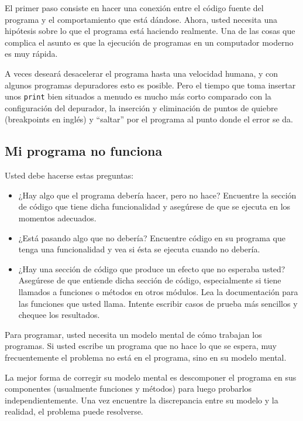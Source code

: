 El primer paso consiste en hacer una conexión entre el código fuente
del programa y el comportamiento que está dándose. Ahora, usted necesita
una hipótesis sobre lo que el programa está haciendo realmente. Una
de las cosas que complica el asunto es que la ejecución de programas
en un computador moderno es muy rápida.

A veces deseará desacelerar el programa hasta una velocidad humana,
y con algunos programas depuradores esto es posible. Pero el tiempo
que toma insertar unos \texttt{print} bien situados a menudo es mucho
más corto comparado con la configuración del depurador, la inserción
y eliminación de puntos de quiebre (breakpoints en inglés) y ``saltar''
por el programa al punto donde el error se da.

\subsection{Mi programa no funciona}

Usted debe hacerse estas preguntas:
\begin{itemize}
\item ¿Hay algo que el programa debería hacer, pero no hace? Encuentre la
sección de código que tiene dicha funcionalidad y asegúrese de que
se ejecuta en los momentos adecuados.
\item ¿Está pasando algo que no debería? Encuentre código en su programa
que tenga una funcionalidad y vea si ésta se ejecuta cuando no debería.
\item ¿Hay una sección de código que produce un efecto que no esperaba usted?
Asegúrese de que entiende dicha sección de código, especialmente si
tiene llamados a funciones o métodos en otros módulos. Lea la documentación
para las funciones que usted llama. Intente escribir casos de prueba
más sencillos y chequee los resultados.
\end{itemize}
Para programar, usted necesita un modelo mental de cómo trabajan los
programas. Si usted escribe un programa que no hace lo que se espera,
muy frecuentemente el problema no está en el programa, sino en su
modelo mental.

 

La mejor forma de corregir su modelo mental es descomponer el programa
en sus componentes (usualmente funciones y métodos) para luego probarlos
independientemente. Una vez encuentre la discrepancia entre su modelo
y la realidad, el problema puede resolverse.


